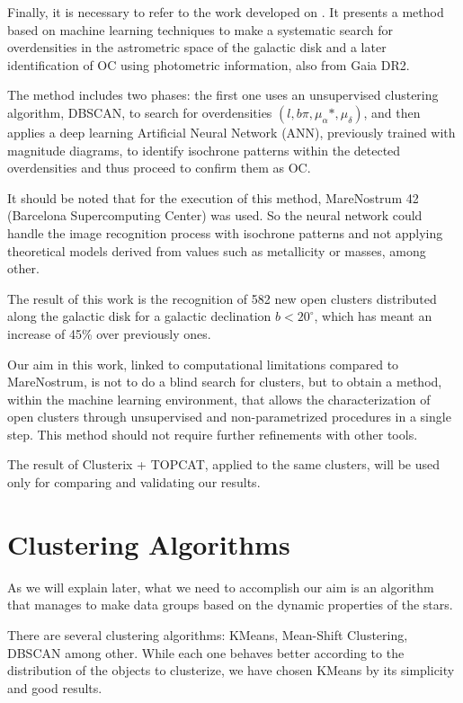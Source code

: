 \documentclass[11pt, a4paper, english]{book}
\begin{document}
Finally, it is necessary to refer to the work developed on \cite{castro2020hunting}.
It presents a method based on machine learning techniques to make a systematic search
for overdensities in the astrometric space of the galactic disk
and a later identification of OC using photometric information, also from Gaia DR2.

The method includes two phases: the first one uses an unsupervised clustering algorithm, DBSCAN,
to search for overdensities $(l, b \pi, \mu_{\alpha} *, \mu_{\delta})$,
and then applies a deep learning Artificial Neural Network (ANN),
previously trained with magnitude diagrams,
to identify isochrone patterns within the detected overdensities and thus proceed to confirm them as OC.

It should be noted that for the execution of this method,
MareNostrum 42 (Barcelona Supercomputing Center) was used.
So the neural network could handle the image recognition process with isochrone patterns
and not applying theoretical models derived from values such as metallicity or masses, among other.

The result of this work is the recognition of 582 new open clusters
distributed along the galactic disk for a galactic declination $b < 20^{\circ}$,
which has meant an increase of 45\% over previously ones.

Our aim in this work, linked to computational limitations compared to MareNostrum,
is not to do a blind search for clusters, but to obtain a method,
within the machine learning environment,
that allows the characterization of open clusters through unsupervised and non-parametrized procedures in a single step.
This method should not require further refinements with other tools.

The result of Clusterix + TOPCAT, applied to the same clusters,
will be used only for comparing and validating our results.

\section{Clustering Algorithms}

As we will explain later, what we need to accomplish our aim is an algorithm
that manages to make data groups based on the dynamic properties of the stars.

There are several clustering algorithms: KMeans, Mean-Shift Clustering, DBSCAN \cite{ester1996density} among other.
While each one behaves better according to the distribution of the objects to clusterize,
we have chosen KMeans by its simplicity and good results.
\end{document}
